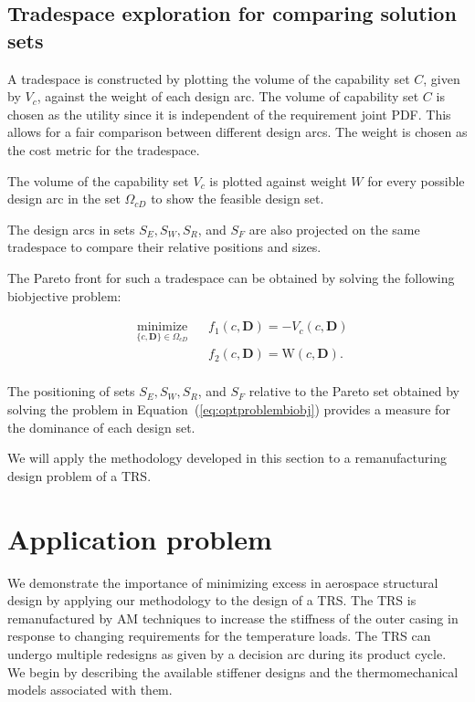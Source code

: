 \subsection{Tradespace exploration for comparing solution sets} \label{subsec:TSE}

A tradespace is constructed by plotting the volume of the capability set $C$, given by $V_c$, against the weight of each design arc. The volume of capability set $C$ is chosen as the utility since it is independent of the requirement joint \ac{PDF}. This allows for a fair comparison between different design arcs. The weight is chosen as the cost metric for the tradespace.

The volume of the capability set $V_c$ is plotted against weight $W$ for every possible design arc in the set $\Omega_{cD}$ to show the feasible design set.

The design arcs in sets $S_E,S_W,S_R$, and $S_F$ are also projected on the same tradespace to compare their relative positions and sizes.

The Pareto front for such a tradespace can be obtained by solving the following biobjective problem:

\begin{equation}
	\label{eq:optproblembiobj}
	\begin{aligned}
		& \underset{\{c,\mathbf{D}\}\in\Omega_{cD}}{\text{minimize}}
		& & {f_1}(c,\mathbf{D}) = -V_c(c,\mathbf{D})\\
		& & & {f_2}(c,\mathbf{D}) = \textrm{W}\left(c,\mathbf{D}\right).\\
	\end{aligned}
\end{equation}

The positioning of sets $S_E,S_W,S_R$, and $S_F$ relative to the Pareto set obtained by solving the problem in Equation~(\ref{eq:optproblembiobj}) provides a measure for the dominance of each design set.

We will apply the methodology developed in this section to a remanufacturing design problem of a \ac{TRS}.

\section{Application problem} \label{sec:TSEcasestudy}

We demonstrate the importance of minimizing excess in aerospace structural design by applying our methodology to the design of a \acf{TRS}. The \ac{TRS} is remanufactured by \ac{AM} techniques to increase the stiffness of the outer casing in response to changing requirements for the temperature loads. The \ac{TRS} can undergo multiple redesigns as given by a decision arc during its product cycle. We begin by describing the available stiffener designs and the thermomechanical models associated with them.

